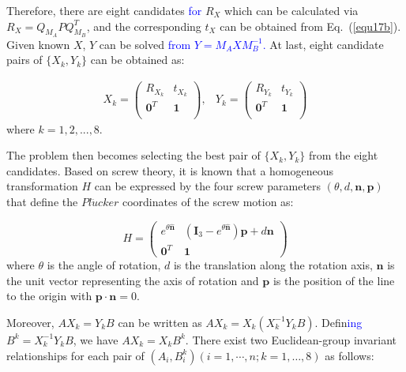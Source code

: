 \documentclass[letterpaper, 10 pt, conference]{ieeeconf}  %
\begin{document}
Therefore, there are eight candidates \textcolor{blue}{for} %
$R_{X}$ which can be calculated via $R_{X}=Q_{M_{A}}PQ_{M_{B}}^T$, and the corresponding $t_{X}$ can be obtained from Eq.\textcolor{blue}{~}(\ref{equ17b}). Given known $X$, $Y$  can be solved \textcolor{blue}{from} %
\textcolor{blue}{$Y = M_AXM_B^{-1}$.} %
 At last, eight candidate pairs of  $\{X_{k},Y_{k}\}$ can be obtained as:

\begin{equation}\label{equ20}
\begin{array}{cc}
X_{k}= \left( \begin{array}{cc}
       R_{X_k} & t_{X_k} \\
       \mathbf{0}^{T} & \mathbf{1}\\
\end{array} \right),&
Y_{k}= \left( \begin{array}{cc}
       R_{Y_k} & t_{Y_k} \\
       \mathbf{0}^{T} & \mathbf{1}\\
\end{array} \right)
\end{array}
\end{equation}
where $k = 1,2,...,8$.

The problem then becomes selecting the best pair of $\{X_k, Y_k\}$ from the eight candidates.
Based on %
 screw theory, it is known that a homogeneous transformation $H$ can be expressed by the four screw parameters $(\theta,d,\mathbf{n},\mathbf{p})$ that define the $Pl\ddot{u}cker$ coordinates of the screw motion as:

\begin{equation}\label{equ21}
H = \left( \begin{array}{cc}
       e^{\theta \hat{\mathbf{n}}} & (\mathbf{I}_{3} - e^{\theta \hat{\mathbf{n}}})\mathbf{p} + d\mathbf{n} \\
       \mathbf{0}^{T} & \mathbf{1}
\end{array} \right)
\end{equation}
where $\theta$ is the angle of rotation, $d$ is the translation along the rotation axis, $\mathbf{n}$ is the unit vector representing the axis of rotation and $\mathbf{p}$ is the position of the line to the origin with $\mathbf{p} \cdot \mathbf{n} = 0$.

Moreover, $A X_k = Y_k B$ can be written as $AX_k=X_k(X_k^{-1}Y_kB)$. Defin\textcolor{blue}{ing} %
 $B^k = X_k^{-1}Y_kB$, %
 we %
  have $AX_k=X_kB^k$. There exist two Euclidean-group invariant relationships for each pair of $(A_{i},B_{i}^k)( i = 1,\cdots,n; k=1,\dots,8)$ as follows:
\end{document}

